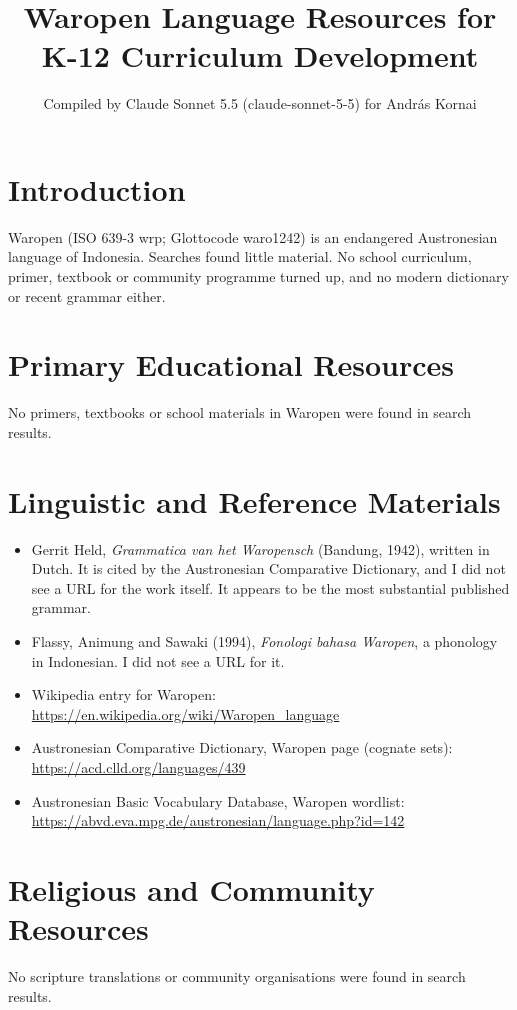 \documentclass[12pt]{article}
\title{Waropen Language Resources for K-12 Curriculum Development}
\author{Compiled by Claude Sonnet 5.5 (claude-sonnet-5-5) for Andr\'as Kornai}
\date{}
\begin{document}
\maketitle

\section{Introduction}
Waropen (ISO 639-3 wrp; Glottocode waro1242) is an endangered Austronesian language of Indonesia. Searches found little material. No school curriculum, primer, textbook or community programme turned up, and no modern dictionary or recent grammar either.

\section{Primary Educational Resources}
No primers, textbooks or school materials in Waropen were found in search results.

\section{Linguistic and Reference Materials}
\begin{itemize}
\item Gerrit Held, \emph{Grammatica van het Waropensch} (Bandung, 1942), written in Dutch. It is cited by the Austronesian Comparative Dictionary, and I did not see a URL for the work itself. It appears to be the most substantial published grammar.
\item Flassy, Animung and Sawaki (1994), \emph{Fonologi bahasa Waropen}, a phonology in Indonesian. I did not see a URL for it.
\item Wikipedia entry for Waropen: \url{https://en.wikipedia.org/wiki/Waropen_language}
\item Austronesian Comparative Dictionary, Waropen page (cognate sets): \url{https://acd.clld.org/languages/439}
\item Austronesian Basic Vocabulary Database, Waropen wordlist: \url{https://abvd.eva.mpg.de/austronesian/language.php?id=142}
\end{itemize}

\section{Religious and Community Resources}
No scripture translations or community organisations were found in search results.
\end{document}

